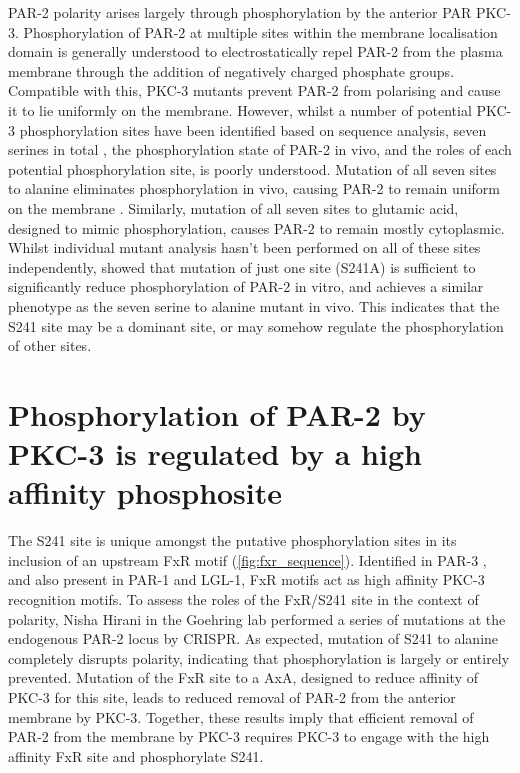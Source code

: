 \documentclass[12pt]{"report"}
\begin{document}
PAR-2 polarity arises largely through phosphorylation by the anterior PAR PKC-3. Phosphorylation of PAR-2 at multiple sites within the membrane localisation domain is generally understood to electrostatically repel PAR-2 from the plasma membrane through the addition of negatively charged phosphate groups. Compatible with this, PKC-3 mutants prevent PAR-2 from polarising and cause it to lie uniformly on the membrane. However, whilst a number of potential PKC-3 phosphorylation sites have been identified based on sequence analysis, seven serines in total \citep{Hao2006}, the phosphorylation state of PAR-2 in vivo, and the roles of each potential phosphorylation site, is poorly understood. Mutation of all seven sites to alanine eliminates phosphorylation in vivo, causing PAR-2 to remain uniform on the membrane \citep{Hao2006}. Similarly, mutation of all seven sites to glutamic acid, designed to mimic phosphorylation, causes PAR-2 to remain mostly cytoplasmic. Whilst individual mutant analysis hasn't been performed on all of these sites independently, \textcite{Motegi2011} showed that mutation of just one site (S241A) is sufficient to significantly reduce phosphorylation of PAR-2 in vitro, and achieves a similar phenotype as the seven serine to alanine mutant in vivo. This indicates that the S241 site may be a dominant site, or may somehow regulate the phosphorylation of other sites.\\

\section*{Phosphorylation of PAR-2 by PKC-3 is regulated by a high affinity phosphosite}

The S241 site is unique amongst the putative phosphorylation sites in its inclusion of an upstream FxR motif (\cref{fig:fxr_sequence}). Identified in PAR-3 \citep{Soriano2016}, and also present in PAR-1 and LGL-1, FxR motifs act as high affinity PKC-3 recognition motifs. To assess the roles of the FxR/S241 site in the context of polarity, Nisha Hirani in the Goehring lab performed a series of mutations at the endogenous PAR-2 locus by CRISPR. As expected, mutation of S241 to alanine completely disrupts polarity, indicating that phosphorylation is largely or entirely prevented. Mutation of the FxR site to a AxA, designed to reduce affinity of PKC-3 for this site, leads to reduced removal of PAR-2 from the anterior membrane by PKC-3. Together, these results imply that efficient removal of PAR-2 from the membrane by PKC-3 requires PKC-3 to engage with the high affinity FxR site and phosphorylate S241.\\
\end{document}
